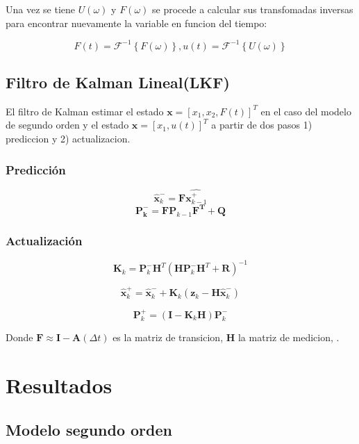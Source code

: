\documentclass[conference]{IEEEtran}
\begin{document}
Una vez se tiene $U(\omega)$ y $F(\omega)$ se procede a calcular
sus transfomadas inversas para encontrar nuevamente la variable en
funcion del tiempo: 

\[
	F(t) = \mathcal{F}^{-1}\left\{F(\omega) \right\} , u(t) = \mathcal{F}^{-1}\left\{U(\omega)\right\}
\]



\subsection{Filtro de Kalman Lineal(LKF)}

El filtro de Kalman estimar el estado $\textbf{x} = [x_1, x_2, F(t)]^T$ en el caso del modelo de segundo
orden y el estado $\textbf{x} = [x_1, u(t)]^T$ a partir de dos pasos 1) prediccion y 2) actualizacion.


\subsubsection{Predicci\'on}


\[
\hat{\mathbf{x}}_k^- = \mathbf{F}\hat{\mathbf{x}^+_{k-1}}
\]
\[
\mathbf{P^-_k} = \mathbf{F} \mathbf{P}_{k-1} \mathbf{F^T} + \mathbf{Q}
\]

\subsubsection{Actualizaci\'on}

\[
\mathbf{K}_k = \mathbf{P}_k^- \mathbf{H}^T \left( \mathbf{H} \mathbf{P}_k^- \mathbf{H}^T + \mathbf{R} \right)^{-1}
\]

\[
\hat{\mathbf{x}}_k^+ = \hat{\mathbf{x}}_k^- + \mathbf{K}_k \left( \mathbf{z}_k - \mathbf{H} \hat{\mathbf{x}}_k^- \right)
\]

\[
\mathbf{P}_k^+ = \left( \mathbf{I} - \mathbf{K}_k \mathbf{H} \right) \mathbf{P}_k^-
\]

Donde $\mathbf{F}\approx \mathbf{I} - \mathbf{A}(\Delta t) $ es la matriz de transicion, $\mathbf{H}$  la matriz de medicion, .





\section{Resultados}

\subsection{Modelo segundo orden}
\end{document}
